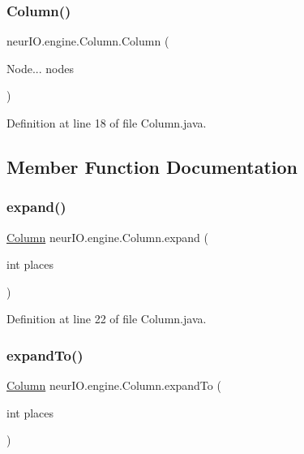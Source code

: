\subsubsection{\texorpdfstring{Column()}{Column()}}
{\footnotesize\ttfamily neur\+I\+O.\+engine.\+Column.\+Column (\begin{DoxyParamCaption}\item[{Node...}]{nodes }\end{DoxyParamCaption})}



Definition at line 18 of file Column.\+java.



\subsection{Member Function Documentation}
\mbox{\label{classneur_i_o_1_1engine_1_1_column_a19d03fcb7a397996c4b9e95bea1aad40}} 
\subsubsection{\texorpdfstring{expand()}{expand()}}
{\footnotesize\ttfamily \hyperlink{classneur_i_o_1_1engine_1_1_column}{Column} neur\+I\+O.\+engine.\+Column.\+expand (\begin{DoxyParamCaption}\item[{int}]{places }\end{DoxyParamCaption})}



Definition at line 22 of file Column.\+java.

\mbox{\label{classneur_i_o_1_1engine_1_1_column_a367f262a4bb1df7e2c1c911824b0fa45}} 
\subsubsection{\texorpdfstring{expand\+To()}{expandTo()}}
{\footnotesize\ttfamily \hyperlink{classneur_i_o_1_1engine_1_1_column}{Column} neur\+I\+O.\+engine.\+Column.\+expand\+To (\begin{DoxyParamCaption}\item[{int}]{places }\end{DoxyParamCaption})}



